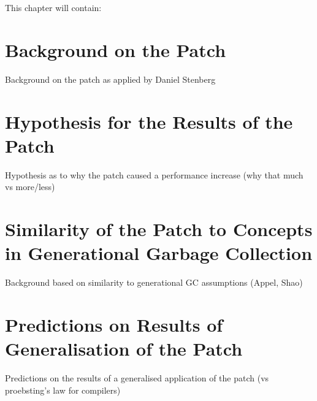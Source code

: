 This chapter will contain:

\section{Background on the Patch}

Background on the patch as applied by Daniel Stenberg

\section{Hypothesis for the Results of the Patch}

Hypothesis as to why the patch caused a performance increase (why that much vs more/less)

\section{Similarity of the Patch to Concepts in Generational Garbage Collection}

Background based on similarity to generational GC assumptions (Appel, Shao)

\section{Predictions on Results of Generalisation of the Patch}

Predictions on the results of a generalised application of the patch (vs proebsting's law for compilers)
